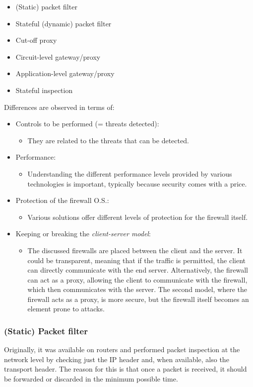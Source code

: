 \begin{itemize}
	\item (Static) packet filter
	\item Stateful (dynamic) packet filter
	\item Cut-off proxy
	\item Circuit-level gateway/proxy
	\item Application-level gateway/proxy
	\item Stateful inspection
\end{itemize}
Differences are observed in terms of:
\begin{itemize}
	\item Controls to be performed (= threats detected):
	      \begin{itemize}
		      \item They are related to the threats that can be detected.
	      \end{itemize}
	\item Performance:
	      \begin{itemize}
		      \item Understanding the different performance levels provided by various technologies is important, typically because security comes with a price.
	      \end{itemize}
	\item Protection of the firewall O.S.:
	      \begin{itemize}
		      \item Various solutions offer different levels of protection for the firewall itself.
	      \end{itemize}
	\item Keeping or breaking the \textit{client-server model}:
	      \begin{itemize}
		      \item The discussed firewalls are placed between the client and the server. It could be transparent, meaning that if the traffic is permitted, the client can directly communicate with the end server. Alternatively, the firewall can act as a proxy, allowing the client to communicate with the firewall, which then communicates with the server. The second model, where the firewall acts as a proxy, is more secure, but the firewall itself becomes an element prone to attacks.
	      \end{itemize}
\end{itemize}


\subsubsection{(Static) Packet filter}
Originally, it was available on routers and performed packet inspection at the network level by checking just the IP header and, when available, also the transport header. The reason for this is that once a packet is received, it should be forwarded or discarded in the minimum possible time.

